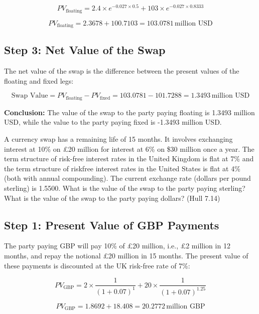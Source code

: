 \documentclass[12pt,letterpaper, onecolumn]{exam}
\begin{document}
\begin{questions}
\begin{solution}
\[
PV_{\text{floating}} = 2.4 \times e^{-0.027 \times 0.5} + 103 \times e^{-0.027 \times 0.8333}
\]

\[
PV_{\text{floating}} = 2.3678 + 100.7103 = 103.0781 \, \text{million USD}
\]

\subsection*{Step 3: Net Value of the Swap}

The net value of the swap is the difference between the present values of the floating and fixed legs:

\[
\text{Swap Value} = PV_{\text{floating}} - PV_{\text{fixed}} = 103.0781 - 101.7288 = 1.3493 \, \text{million USD}
\]

\textbf{Conclusion:} The value of the swap to the party paying floating is 1.3493 million USD, while the value to the party paying fixed is -1.3493 million USD.


\end{solution}


    \newpage
    
    \question A currency swap has a remaining life of 15 months. It involves exchanging interest at
10\% on £20 million for interest at 6\% on \$30 million once a year. The term structure of
risk-free interest rates in the United Kingdom is flat at 7\% and the term structure of
riskfree interest rates in the United States is flat at 4\% (both with annual compounding).
The current exchange rate (dollars per pound sterling) is 1.5500. What is the value of the
swap to the party paying sterling? What is the value of the swap to the party paying
dollars? (Hull 7.14)

    \begin{solution}
    \subsection*{Step 1: Present Value of GBP Payments}

The party paying GBP will pay 10\% of £20 million, i.e., £2 million in 12 months, and repay the notional £20 million in 15 months. The present value of these payments is discounted at the UK risk-free rate of 7\%:

\[
PV_{\text{GBP}} = 2 \times \frac{1}{(1 + 0.07)^1} + 20 \times \frac{1}{(1 + 0.07)^{1.25}}
\]

\[
PV_{\text{GBP}} = 1.8692 + 18.408 = 20.2772 \, \text{million GBP}
\]


\end{solution}
\end{questions}
\end{document}
